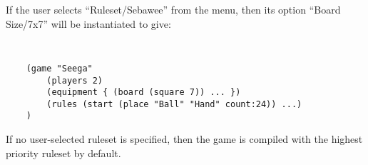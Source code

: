 \noindent
If the user selects ``Ruleset/Sebawee'' from the menu, then its option ``Board Size/7x7'' will be instantiated to give:

{\tt
\begin{verbatim}
    (game "Seega"  
        (players 2)  
        (equipment { (board (square 7)) ... }) 
        (rules (start (place "Ball" "Hand" count:24)) ...)
    )
\end{verbatim}
}

\noindent
If no user-selected ruleset is specified, then the game is compiled with the highest priority ruleset by default.
